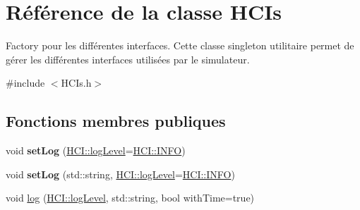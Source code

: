 \hypertarget{classHCIs}{\section{Référence de la classe H\-C\-Is}
\label{classHCIs}
}


Factory pour les différentes interfaces. Cette classe singleton utilitaire permet de gérer les différentes interfaces utilisées par le simulateur.  




{\ttfamily \#include $<$H\-C\-Is.\-h$>$}

\subsection*{Fonctions membres publiques}
\begin{DoxyCompactItemize}
\item 
\hypertarget{classHCIs_a890eb6e73b42101e282cb86474f97ca2}{void {\bfseries set\-Log} (\hyperlink{classHCI_a395f0ab7958108f23c34c7a04b56c4b0}{H\-C\-I\-::log\-Level}=\hyperlink{classHCI_a395f0ab7958108f23c34c7a04b56c4b0ab3f339d63b08c4a353f0f6609366d6a2}{H\-C\-I\-::\-I\-N\-F\-O})}\label{classHCIs_a890eb6e73b42101e282cb86474f97ca2}

\item 
\hypertarget{classHCIs_a9e3e7099368ff5916e2d87d7741fc66a}{void {\bfseries set\-Log} (std\-::string, \hyperlink{classHCI_a395f0ab7958108f23c34c7a04b56c4b0}{H\-C\-I\-::log\-Level}=\hyperlink{classHCI_a395f0ab7958108f23c34c7a04b56c4b0ab3f339d63b08c4a353f0f6609366d6a2}{H\-C\-I\-::\-I\-N\-F\-O})}\label{classHCIs_a9e3e7099368ff5916e2d87d7741fc66a}

\item 
\hypertarget{classHCIs_a29a701816f31e573013052410beb6a82}{void \hyperlink{classHCIs_a29a701816f31e573013052410beb6a82}{log} (\hyperlink{classHCI_a395f0ab7958108f23c34c7a04b56c4b0}{H\-C\-I\-::log\-Level}, std\-::string, bool with\-Time=true)}\label{classHCIs_a29a701816f31e573013052410beb6a82}


\end{DoxyCompactItemize}
